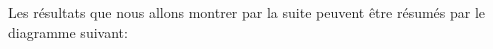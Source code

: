 Les résultats que nous allons montrer par la suite peuvent être résumés par le diagramme suivant:
\begin{comment}
\begin{figure*}[h!]
    $$
    \begin{tikzcd}
    	& {\text{si pour tout } k \in \llbracket 1, n-1 \rrbracket, \mathrm{Tr}(A^k)=0 \text{ et si \dots}} & {} \\
    	{A \text{ est nilpotente}} && {A \text{ est diagonalisable}}
    	\arrow["{\dots \mathrm{Tr}(A^n) \not= 0}"{description}, curve={height=6pt}, Rightarrow, from=1-2, to=2-3]
    	\arrow["{\dots \mathrm{Tr}(A^n)=0}"{description}, curve={height=-6pt}, Rightarrow, 2tail reversed, from=1-2, to=2-1]
    \end{tikzcd}
    $$
    \caption{Figure à compiler}
\end{figure*}
\end{comment}

